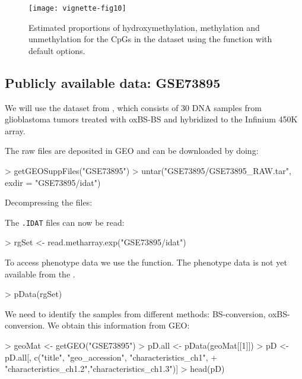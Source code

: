 \documentclass{article}
\begin{document}
\begin{figure*}[h]
 \texttt{[image: vignette-fig10]}
 \caption{\label{fig:fig10} Estimated proportions of hydroxymethylation, methylation and unmethylation for the CpGs in the dataset using the  function with default options.}
\end{figure*}

\subsection{Publicly available data: GSE73895}

We will use the dataset from \cite{pmid27886174}, which consists of 30 DNA samples from glioblastoma tumors treated with oxBS-BS and hybridized to the Infinium 450K array.


The raw files are deposited in GEO and can be downloaded by doing:
\begin{Schunk}
\begin{Sinput}
> getGEOSuppFiles("GSE73895")
> untar("GSE73895/GSE73895_RAW.tar", exdir = "GSE73895/idat")
\end{Sinput}
\end{Schunk}

Decompressing the files:
\begin{Schunk}
\end{Schunk}

The \verb|.IDAT| files can now be read:
\begin{Schunk}
\begin{Sinput}
> rgSet <- read.metharray.exp("GSE73895/idat")
\end{Sinput}
\end{Schunk}


To access phenotype data we use the  function. The phenotype data is not yet available from the .
\begin{Schunk}
\begin{Sinput}
> pData(rgSet)
\end{Sinput}
\end{Schunk}

We need to identify the samples from different methods: BS-conversion, oxBS-conversion. We obtain this information from GEO:

\begin{Schunk}
\begin{Sinput}
> geoMat <- getGEO("GSE73895")
> pD.all <- pData(geoMat[[1]])
> pD <- pD.all[, c("title", "geo_accession", "characteristics_ch1",
+                  "characteristics_ch1.2","characteristics_ch1.3")]
> head(pD)
\end{Sinput}
\end{Schunk}
\end{document}
